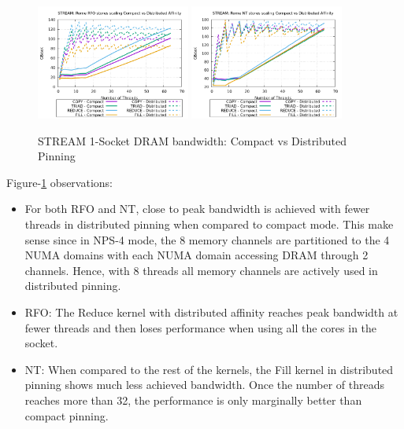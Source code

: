 \documentclass{article}
\begin{document}
\begin{figure}[!ht]
    \centering
    \includegraphics[width=0.45\textwidth]{../mem_bw_scale/Rome_scale_affinity_rfo}
    \includegraphics[width=0.45\textwidth]{../mem_bw_scale/Rome_scale_affinity_nt}
    \caption{STREAM 1-Socket DRAM bandwidth: Compact vs Distributed Pinning}
    \label{figure:mem_bw_scale_affinity_rfo_nt}
\end{figure}

Figure-\ref{figure:mem_bw_scale_affinity_rfo_nt} observations:
\begin{itemize}
\item For both RFO and NT, close to peak bandwidth is achieved with fewer threads in distributed pinning when compared to compact mode. This make sense since in NPS-4 mode, the 8 memory channels are partitioned to the 4 NUMA domains with each NUMA domain accessing DRAM through 2 channels. Hence, with 8 threads all memory channels are actively used in distributed pinning.
\item RFO: The Reduce kernel with distributed affinity reaches peak bandwidth at fewer threads and then loses performance when using all the cores in the socket.
\item NT: When compared to the rest of the kernels, the Fill kernel in distributed pinning shows much less achieved bandwidth. Once the number of threads reaches more than 32, the performance is only marginally better than compact pinning.
\end{itemize}
\end{document}
